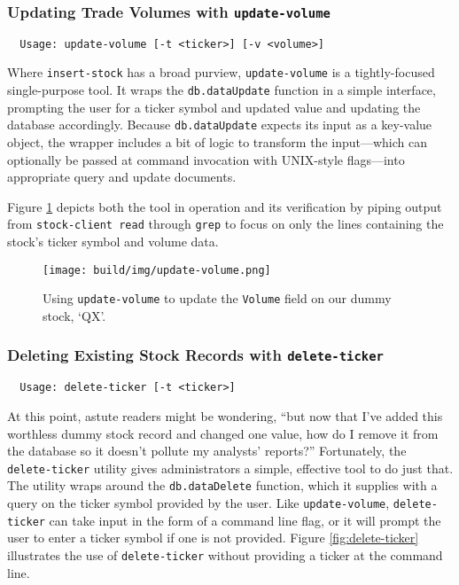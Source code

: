 \documentclass[
11pt,
titlepage,
]{article}
\begin{document}
\subsubsection{Updating Trade Volumes with \texttt{update-volume}}

\begin{lstlisting}
  Usage: update-volume [-t <ticker>] [-v <volume>]
\end{lstlisting}

Where \texttt{insert-stock} has a broad purview, \texttt{update-volume} is a
tightly-focused single-purpose tool. It wraps the \texttt{db.dataUpdate}
function in a simple interface, prompting the user for a ticker symbol and
updated value and updating the database accordingly. Because
\texttt{db.dataUpdate} expects its input as a key-value object, the wrapper
includes a bit of logic to transform the input---which can optionally be passed
at command invocation with UNIX-style flags---into appropriate query and update
documents.

Figure \ref{fig:update-volume} depicts both the tool in operation and its
verification by piping output from \texttt{stock-client read} through
\texttt{grep} to focus on only the lines containing the stock's ticker symbol
and volume data.

\begin{figure}[tbp]
  \texttt{[image: build/img/update-volume.png]}
  \caption{Using \texttt{update-volume} to update the \texttt{Volume} field on
    our dummy stock, `QX'.}
  \label{fig:update-volume}
\end{figure}

\pagebreak

\subsubsection{Deleting Existing Stock Records with \texttt{delete-ticker}}

\begin{lstlisting}
  Usage: delete-ticker [-t <ticker>]
\end{lstlisting}

At this point, astute readers might be wondering, ``but now that I've added this
worthless dummy stock record and changed one value, how do I remove it from the
database so it doesn't pollute my analysts' reports?'' Fortunately, the
\texttt{delete-ticker} utility gives administrators a simple, effective tool to
do just that. The utility wraps around the \texttt{db.dataDelete} function,
which it supplies with a query on the ticker symbol provided by the user. Like
\texttt{update-volume}, \texttt{delete-ticker} can take input in the form of a
command line flag, or it will prompt the user to enter a ticker symbol if one is
not provided. Figure \ref{fig:delete-ticker} illustrates the use of
\texttt{delete-ticker} without providing a ticker at the command line.
\end{document}
